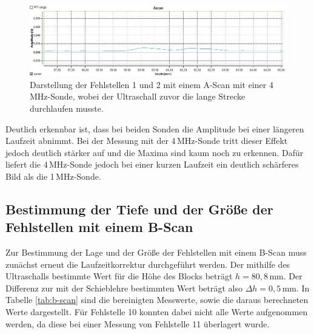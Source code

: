 \begin{figure}[H]
  \centering
  \includegraphics[width=\textwidth]{data/4mhzdoppelteFehlstellelangeLaufzeit.jpg}
  \caption{Darstellung der Fehlstellen 1 und 2 mit einem A-Scan mit einer 4\,MHz-Sonde, wobei der Ultraschall
  zuvor die lange Strecke durchlaufen musste.}
  \label{fig:auflösung4}
\end{figure}

Deutlich erkennbar ist, dass bei beiden Sonden die Amplitude bei einer längeren
Laufzeit abnimmt. Bei der Messung mit der 4\,MHz-Sonde tritt dieser Effekt jedoch
deutlich stärker auf und die Maxima sind kaum noch zu erkennen. Dafür liefert die
4\,MHz-Sonde jedoch bei einer kurzen Laufzeit ein deutlich schärferes Bild als die
1\,MHz-Sonde.

\subsection{Bestimmung der Tiefe und der Größe der Fehlstellen mit einem B-Scan}
\label{subsec:B_scan_Fehlstellen}

Zur Bestimmung der Lage und der Größe der Fehlstellen mit einem B-Scan muss zunächst
erneut die Laufzeitkorrektur durchgeführt werden. Der mithilfe des Ultraschalls bestimmte
Wert für die Höhe des Blocks beträgt $h=80{,}8\,$mm. Der Differenz zur mit der Schieblehre
bestimmten Wert beträgt also $\Delta h=0{,}5\,$mm. In Tabelle \ref{tab:b-scan}
sind die bereinigten Messwerte, sowie die daraus berechneten Werte dargestellt.
Für Fehlstelle 10 konnten dabei nicht alle Werte aufgenommen werden, da diese bei einer
Messung von Fehlstelle 11 überlagert wurde.

